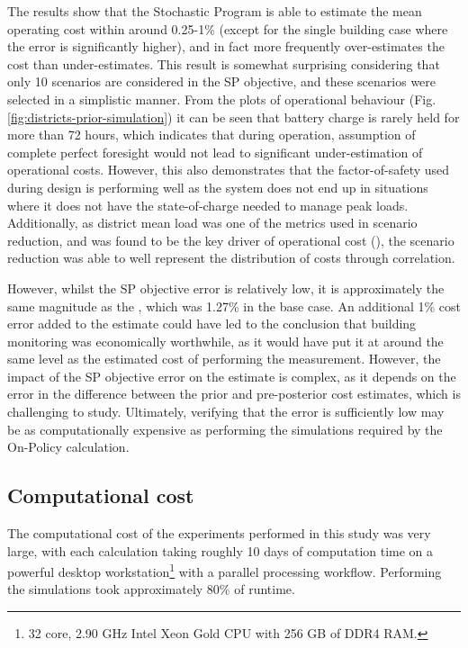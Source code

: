 \begin{subappendices}
    The results show that the Stochastic Program is able to estimate the mean operating cost within around 0.25-1\% (except for the single building case where the error is significantly higher), and in fact more frequently over-estimates the cost than under-estimates. This result is somewhat surprising considering that only 10 scenarios are considered in the SP objective, and these scenarios were selected in a simplistic manner. From the plots of operational behaviour (Fig. \ref{fig:districts-prior-simulation}) it can be seen that battery charge is rarely held for more than 72 hours, which indicates that during operation, assumption of complete perfect foresight would not lead to significant under-estimation of operational costs. However, this also demonstrates that the factor-of-safety used during design is performing well as the system does not end up in situations where it does not have the state-of-charge needed to manage peak loads. Additionally, as district mean load was one of the metrics used in scenario reduction, and was found to be the key driver of operational cost (), the scenario reduction was able to well represent the distribution of costs through correlation.

    However, whilst the SP objective error is relatively low, it is approximately the same magnitude as the , which was 1.27\% in the base case. An additional 1\% cost error added to the  estimate could have led to the conclusion that building monitoring was economically worthwhile, as it would have put it at around the same level as the estimated cost of performing the measurement. However, the impact of the SP objective error on the  estimate is complex, as it depends on the error in the difference between the prior and pre-posterior cost estimates, which is challenging to study. Ultimately, verifying that the error is sufficiently low may be as computationally expensive as performing the simulations required by the On-Policy  calculation.


    \subsection{Computational cost}

    The computational cost of the experiments performed in this study was very large, with each  calculation taking roughly 10 days of computation time on a powerful desktop workstation\footnote{32 core, 2.90 GHz Intel Xeon Gold CPU with 256 GB of DDR4 RAM.} with a parallel processing workflow. Performing the simulations took approximately 80\% of runtime.


\end{subappendices}
